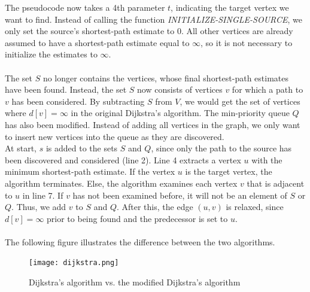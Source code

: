 \documentclass[11pt]{article}
\begin{document}
\noindent The pseudocode now takes a 4th parameter $t$, indicating the target vertex we want to find. Instead of calling the function \textit{INITIALIZE-SINGLE-SOURCE}, we only set the source's shortest-path estimate to 0. All other vertices are already assumed to have a shortest-path estimate equal to $\infty$, so it is not necessary to initialize the estimates to $\infty$.\\\\
The set $S$ no longer contains the vertices, whose final shortest-path estimates have been found. Instead, the set $S$ now consists of vertices $v$ for which a path to $v$ has been considered. By subtracting $S$ from $V$, we would get the set of vertices where $d[v]=\infty$ in the original Dijkstra's algorithm. The min-priority queue $Q$ has also been modified. Instead of adding all vertices in the graph, we only want to insert new vertices into the queue as they are discovered.\\ 
At start, $s$ is added to the sets $S$ and $Q$, since only the path to the source has been discovered and considered (line 2). Line 4 extracts a vertex $u$ with the minimum shortest-path estimate. If the vertex $u$ is the target vertex, the algorithm terminates. Else, the algorithm examines each vertex $v$ that is adjacent to $u$ in line 7. If $v$ has not been examined before, it will not be an element of $S$ or $Q$. Thus, we add $v$ to $S$ and $Q$. After this, the edge $(u,v)$ is relaxed, since $d[v]=\infty$ prior to being found and the predecessor is set to $u$.\\\\
The following figure illustrates the difference between the two algorithms.\\
\begin{figure}[H]
\centering
\texttt{[image: dijkstra.png]}
\caption{Dijkstra's algorithm vs. the modified Dijkstra's algorithm}
\end{figure}


\end{document}
